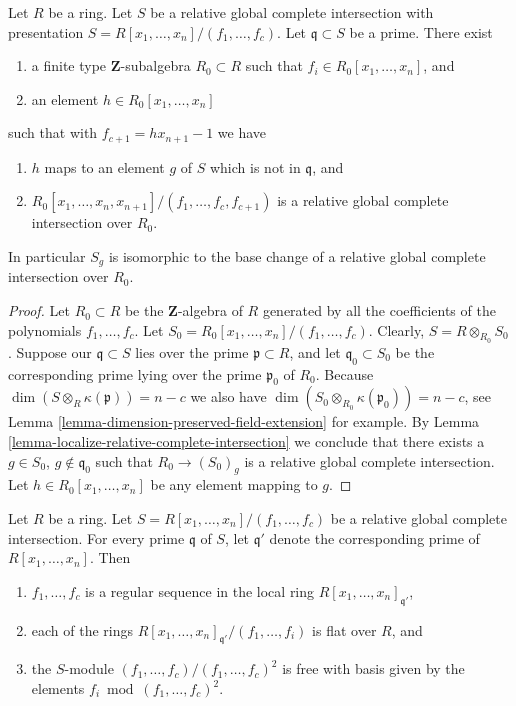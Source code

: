 \begin{lemma}
\label{lemma-relative-global-complete-intersection-Noetherian}
Let $R$ be a ring. Let $S$ be a relative global complete intersection
with presentation $S = R[x_1, \ldots, x_n]/(f_1, \ldots, f_c)$.
Let $\mathfrak q \subset S$ be a prime. There exist
\begin{enumerate}
\item  a finite type $\mathbf{Z}$-subalgebra $R_0 \subset R$
such that $f_i \in R_0[x_1, \ldots, x_n]$, and
\item an element $h \in R_0[x_1, \ldots, x_n]$
\end{enumerate}
such that with $f_{c + 1} = h x_{n + 1} - 1$ we have
\begin{enumerate}
\item $h$ maps to an element $g$ of $S$ which is not in $\mathfrak q$, and
\item $R_0[x_1, \ldots, x_n, x_{n + 1}]/(f_1, \ldots, f_c, f_{c + 1})$
is a relative global complete intersection over $R_0$.
\end{enumerate}
In particular $S_g$ is isomorphic to the base change of a
relative global complete intersection over $R_0$.
\end{lemma}

\begin{proof}
Let $R_0 \subset R$ be the $\mathbf{Z}$-algebra of $R$
generated by all the coefficients of the polynomials
$f_1, \ldots, f_c$. Let $S_0 = R_0[x_1, \ldots, x_n]/(f_1, \ldots, f_c)$.
Clearly, $S = R \otimes_{R_0} S_0$.
Suppose our $\mathfrak q \subset S$ lies over
the prime  $\mathfrak p \subset R$, and
let $\mathfrak q_0 \subset S_0$ be the corresponding prime
lying over the prime $\mathfrak p_0$ of $R_0$.
Because $\dim (S \otimes_R \kappa(\mathfrak p) ) = n - c$
we also have $\dim (S_0 \otimes_{R_0} \kappa(\mathfrak p_0)) = n - c$,
see Lemma \ref{lemma-dimension-preserved-field-extension} for example.
By Lemma \ref{lemma-localize-relative-complete-intersection} we
conclude that there exists a $g \in S_0$, $g \not \in \mathfrak q_0$
such that $R_0 \to (S_0)_g$ is a relative global complete
intersection. Let $h \in R_0[x_1, \ldots, x_n]$ be any element
mapping to $g$.
\end{proof}

\begin{lemma}
\label{lemma-relative-global-complete-intersection-conormal}
Let $R$ be a ring. Let $S = R[x_1, \ldots, x_n]/(f_1, \ldots, f_c)$
be a relative global complete intersection. For every prime
$\mathfrak q$ of $S$, let $\mathfrak q'$ denote the corresponding
prime of $R[x_1, \ldots, x_n]$. Then
\begin{enumerate}
\item $f_1, \ldots, f_c$ is a regular sequence in the local ring
$R[x_1, \ldots, x_n]_{\mathfrak q'}$,
\item each of the rings
$R[x_1, \ldots, x_n]_{\mathfrak q'}/(f_1, \ldots, f_i)$ is flat over $R$, and
\item the $S$-module $(f_1, \ldots, f_c)/(f_1, \ldots, f_c)^2$
is free with basis given by the elements $f_i \bmod (f_1, \ldots, f_c)^2$.
\end{enumerate}
\end{lemma}

